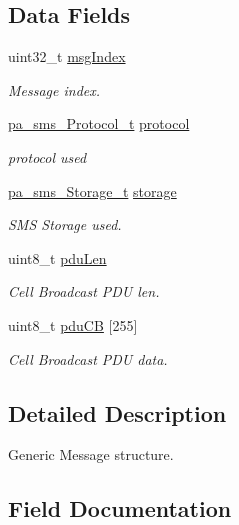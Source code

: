 \subsection*{Data Fields}
\begin{DoxyCompactItemize}
\item 
uint32\+\_\+t \hyperlink{structpa__sms___new_message_indication__t_af1fa8e8b8c39fbe0fd4366d39e7aad86}{msg\+Index}
\begin{DoxyCompactList}\small\item\em Message index. \end{DoxyCompactList}\item 
\hyperlink{pa__sms_8h_a2bfd5b5bfad47343ed4776737b50af0f}{pa\+\_\+sms\+\_\+\+Protocol\+\_\+t} \hyperlink{structpa__sms___new_message_indication__t_af342f9e0811bc955bf72c334d6ed81bd}{protocol}
\begin{DoxyCompactList}\small\item\em protocol used \end{DoxyCompactList}\item 
\hyperlink{pa__sms_8h_a12db350a7e9630c84a3956cfb7a698da}{pa\+\_\+sms\+\_\+\+Storage\+\_\+t} \hyperlink{structpa__sms___new_message_indication__t_a4d8bbb87b8616282a0b1fa2765e1c280}{storage}
\begin{DoxyCompactList}\small\item\em S\+MS Storage used. \end{DoxyCompactList}\item 
uint8\+\_\+t \hyperlink{structpa__sms___new_message_indication__t_a00dc7fc944f19d93d3291d476cee480f}{pdu\+Len}
\begin{DoxyCompactList}\small\item\em Cell Broadcast P\+DU len. \end{DoxyCompactList}\item 
uint8\+\_\+t \hyperlink{structpa__sms___new_message_indication__t_ab41110bad0ac46a7c365fe562c35b0a0}{pdu\+CB} \mbox{[}255\mbox{]}
\begin{DoxyCompactList}\small\item\em Cell Broadcast P\+DU data. \end{DoxyCompactList}\end{DoxyCompactItemize}


\subsection{Detailed Description}
Generic Message structure. 

\subsection{Field Documentation}
